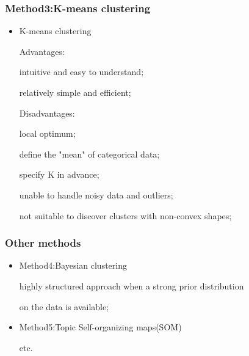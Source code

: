     
\begin{frame}
    \frametitle{Method3:K-means clustering}
    \begin{itemize}   
     \item K-means clustering
     
       Advantages: 

        \hspace{0.6em} intuitive and easy to understand;

        \hspace{0.6em} relatively simple and efficient;

       Disadvantages:

       \hspace{0.6em} local optimum;

       \hspace{0.6em} define the "mean" of categorical data;

       \hspace{0.6em} specify K in advance;

       \hspace{0.6em} unable to handle noisy data and outliers;

       \hspace{0.6em} not suitable to discover clusters with non-convex shapes;
    \end{itemize}
\end{frame}

\begin{frame}
    \frametitle{Other methods}
    \begin{itemize}
     \item Method4:Bayesian clustering

    \hspace{0.9em} highly structured approach when a strong prior distribution 
    
    \hspace{0.9em} on the data is available; 

    \item Method5:Topic Self-organizing maps(SOM) 

    etc.
\end{itemize}
\end{frame}




